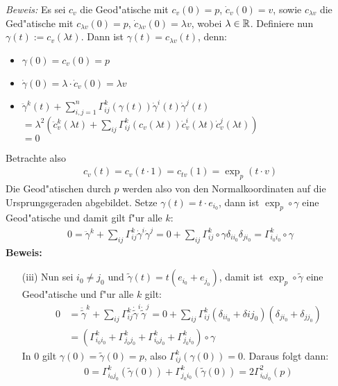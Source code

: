 \begin{Loes}
\emph{Beweis:} Es sei $c_v$ die Geod"atische mit $c_v(0) = p$, $\dot c_v(0) = v$, sowie $c_{\lambda v}$ die Ged"atische mit $c_{\lambda v}(0) = p$, $\dot c_{\lambda v}(0) = \lambda v$, wobei $\lambda \in \operatorname{\mathbb{R}}$.
Definiere nun $\gamma(t) := c_v(\lambda t)$. Dann ist $\gamma(t) = c_{\lambda v}(t)$, denn:\begin{itemize}
\item
	$\gamma(0) = c_v(0) = p$
\item
	$\dot \gamma(0) = \lambda \cdot \dot c_v(0) = \lambda v$
\item
	$\ddot \gamma^k(t) + \sum_{i,j=1}^n \Gamma_{ij}^k(\gamma(t)) \dot\gamma^{i}(t) \dot\gamma^{j}(t)$\\
	$= \lambda^2 \left( \ddot c_v^k(\lambda t) + \sum_{ij} \Gamma_{ij}^k(c_v(\lambda t)) \dot c_v^{i}(\lambda t) \dot c_v^{j}(\lambda t) \right)$\\
	$=0$
\end{itemize}
Betrachte also
\begin{align*}
	c_v(t) = c_v(t \cdot 1) = c_{tv}(1) = \exp_p(t \cdot v)
\end{align*}
Die Geod"atischen durch $p$ werden also von den Normalkoordinaten auf die Ursprungsgeraden abgebildet. Setze $\gamma(t) = t \cdot e_{i_0}$, dann ist $\exp_p \circ \gamma$ eine Geod"atische und damit gilt f"ur alle $k$:
\begin{align*}
	0 = \ddot\gamma^k + \sum_{ij} \Gamma_{ij}^k \dot\gamma^{i} \dot\gamma^{j} = 0 + \sum_{ij} \Gamma_{ij}^k \circ \gamma \delta_{ii_0} \delta_{ji_0} = \Gamma_{i_0i_0}^k \circ \gamma
\end{align*}
\textbf{Beweis:}\begin{enumerate}[label=(\roman*),leftmargin=*,widest=iii]
\item[(iii)]
	Nun sei $i_0 \ne j_0$ und $\tilde\gamma(t) = t(e_{i_0} + e_{j_0})$, damit ist $\exp_p \circ \tilde\gamma$ eine Geod"atische und f"ur alle $k$ gilt:
	\begin{align*}
		0 &= \ddot{\tilde\gamma}^k + \sum_{ij} \Gamma_{ij}^k \dot{\tilde\gamma}^{i} \dot{\tilde\gamma}^{j} = 0 + \sum_{ij} \Gamma_{ij}^k (\delta_{ii_0} + \delta{ij_0}) (\delta_{ji_0} + \delta_{jj_0})\\
		&= \left( \Gamma_{i_0i_0}^k + \Gamma_{j_0j_0}^k + \Gamma_{i_0j_0}^k +\Gamma_{j_0i_0}^k \right) \circ \gamma
	\end{align*}
	In $0$ gilt $\gamma(0) = \tilde\gamma(0) = p$, also $\Gamma_{ij}^k(\gamma(0)) = 0$. Daraus folgt dann:
	\begin{align*}
		0 = \Gamma_{i_0j_0}^k (\tilde\gamma(0)) + \Gamma_{j_0i_0}^k (\tilde\gamma(0)) = 2 \Gamma_{i_0j_0}^2(p)

\end{align*}
\end{enumerate}
\end{Loes}
